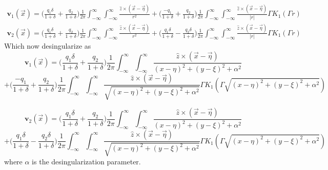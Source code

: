 \documentclass[12pt,twoside]{article}
\newcommand{\bs}  [1]{\boldsymbol{#1}}
\begin{document}
\begin{align}
\bs v_1(\vec{x})=\Big(\frac{q_1 \delta}{1+\delta} +  \frac{q_2}{1+\delta}\Big)\frac{1}{2 \pi} \int_{-\infty}^{\infty}\int_{-\infty}^{\infty} \frac{\hat{z} \times (\vec{x}-\vec{\eta})}{r^2} +  \Big(\frac{-q_1 }{1+\delta} +  \frac{q_2}{1+\delta}\Big)\frac{1}{2 \pi} \int_{-\infty}^{\infty}\int_{-\infty}^{\infty} \frac{\hat{z} \times(\vec{x}-\vec{\eta})}{|r|} \Gamma K_1 (\Gamma r)  \\
\bs v_2(\vec{x})=\Big(\frac{q_1 \delta}{1+\delta} +  \frac{q_2}{1+\delta}\Big)\frac{1}{2 \pi} \int_{-\infty}^{\infty}\int_{-\infty}^{\infty} \frac{\hat{z} \times (\vec{x}-\vec{\eta})}{r^2} +  \Big(\frac{q_1 \delta }{1+\delta} -  \frac{q_2 \delta}{1+\delta}\Big)\frac{1}{2 \pi} \int_{-\infty}^{\infty}\int_{-\infty}^{\infty} \frac{\hat{z} \times(\vec{x}-\vec{\eta})}{|r|} \Gamma K_1 (\Gamma r) 
\end{align}
Which now desingularize as
\[\bs v_1(\vec{x})=\Big(\frac{q_1 \delta}{1+\delta} +  \frac{q_2}{1+\delta}\Big)\frac{1}{2 \pi} \int_{-\infty}^{\infty}\int_{-\infty}^{\infty} \frac{\hat{z} \times (\vec{x}-\vec{\eta})}{(x-\eta)^2 + (y-\xi)^2 + \alpha^2}\]  
\[+  \Big(\frac{-q_1 }{1+\delta} +  \frac{q_2}{1+\delta}\Big)\frac{1}{2 \pi} \int_{-\infty}^{\infty}\int_{-\infty}^{\infty} \frac{\hat{z} \times(\vec{x}-\vec{\eta})}{\sqrt{(x-\eta)^2 + (y-\xi)^2 + \alpha^2}} \Gamma K_1 (\Gamma \sqrt{(x-\eta)^2 + (y-\xi)^2 + \alpha^2})\]
 
\[\bs v_2(\vec{x})=\Big(\frac{q_1 \delta}{1+\delta} +  \frac{q_2}{1+\delta}\Big)\frac{1}{2 \pi} \int_{-\infty}^{\infty}\int_{-\infty}^{\infty} \frac{\hat{z} \times (\vec{x}-\vec{\eta})}{(x-\eta)^2 + (y-\xi)^2 + \alpha^2}\]  \[+ \Big(\frac{q_1 \delta }{1+\delta} -  \frac{q_2 \delta}{1+\delta}\Big)\frac{1}{2 \pi} \int_{-\infty}^{\infty}\int_{-\infty}^{\infty} \frac{\hat{z} \times(\vec{x}-\vec{\eta})}{\sqrt{(x-\eta)^2 + (y-\xi)^2 + \alpha^2}} \Gamma K_1 (\Gamma \sqrt{(x-\eta)^2 + (y-\xi)^2 + \alpha^2}) \]
where $\alpha$ is the desingularization parameter.
\end{document}

